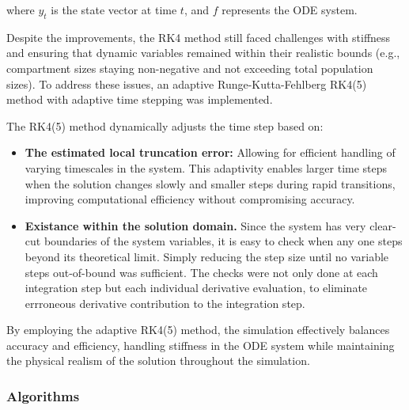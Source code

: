 where $y_t$ is the state vector at time $t$, and $f$ represents the ODE system.

Despite the improvements, the RK4 method still faced challenges with stiffness and ensuring that dynamic variables remained within their realistic bounds (e.g., compartment sizes staying non-negative and not exceeding total population sizes). To address these issues, an adaptive Runge-Kutta-Fehlberg RK4(5) method with adaptive time stepping was implemented.

The RK4(5) method dynamically adjusts the time step based on:
\begin{itemize}
	\item \textbf{The estimated local truncation error:} Allowing for efficient handling of varying timescales in the system. This adaptivity enables larger time steps when the solution changes slowly and smaller steps during rapid transitions, improving computational efficiency without compromising accuracy.
	\item \textbf{Existance within the solution domain.} Since the system has very clear-cut boundaries of the system variables, it is easy to check when any one steps beyond its theoretical limit. Simply reducing the step size until no variable steps out-of-bound was sufficient. The checks were not only done at each integration step but each individual derivative evaluation, to eliminate errroneous derivative contribution to the integration step.
\end{itemize}  

By employing the adaptive RK4(5) method, the simulation effectively balances accuracy and efficiency, handling stiffness in the ODE system while maintaining the physical realism of the solution throughout the simulation.
\subsubsection{Algorithms}

